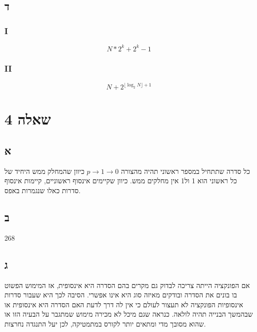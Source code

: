 \documentclass[a4paper]{article}
\begin{document}
\subsection*{ד}
\subsubsection*{I}
\begin{equation*}
    N*2^{k} + 2^{k} - 1
\end{equation*}
\subsubsection*{II}
\begin{equation*}
    N+2^{\lfloor \log_{2}N \rfloor + 1}
\end{equation*}
\section{שאלה 4}
\subsection*{א}
כל סדרה שתתחיל במספר ראשוני תהיה מהצורה
$p \rightarrow 1 \rightarrow 0$
כיוון שהמחלק ממש היחיד של כל ראשוני הוא 1 ול1 אין מחלקים ממש. כיוון שקיימים אינסוף ראשוניים, קיימות אינסוף סדרות כאלו שנגמרות באפס.
\subsection*{ב}
268
\subsection*{ג}
אם הפונקציה הייתה צריכה לבדוק גם מקרים בהם הסדרה היא אינסופית, אז המימוש הפשוט בו בונים את הסדרה ובודקים מאיזה סוג היא אינו אפשרי. הסיבה לכך היא שעבור סדרות אינסופיות הפונקציה לא תעצור לעולם כי אין לה דרך לדעת האם הסדרה היא אינסופית או שבהמשך הבנייה תהיה לולאה. כנראה שגם מיכל לא מכירה מימוש שמתגבר על הבעיה הזו או שהוא מסובך מדי ומתאים יותר לקורס במתמטיקה, לכן יעל התנגדה נחרצות.
\end{document}
